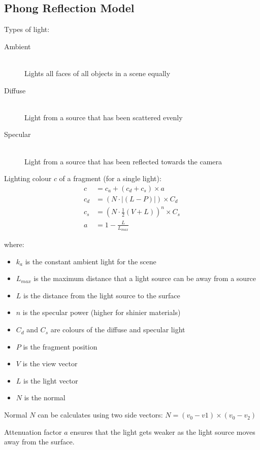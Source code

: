 \documentclass[a4paper]{article}
\begin{document}
\subsection{Phong Reflection Model}

Types of light:

\begin{description}
  \item[Ambient] \hfill \\
    Lights all faces of all objects in a scene equally
  \item[Diffuse] \hfill \\
    Light from a source that has been scattered evenly
  \item[Specular] \hfill \\
    Light from a source that has been reflected towards the camera
\end{description}

Lighting colour $c$ of a fragment (for a single light):
\begin{align*}
      c &= c_{a} + (c_{d} + c_{s}) \times a \\
  c_{d} &= (N \cdot |(L - P)|) \times C_{d} \\
  c_{s} &= (N \cdot \frac{1}{2}(V + L))^{n} \times C_{s}\\
      a &= 1 - \frac{L}{L_{max}}
\end{align*}

where:

\begin{itemize}
  \item $k_{a}$ is the constant ambient light for the scene
  \item $L_{max}$ is the maximum distance that a light source can be away from a
        source
  \item $L$ is the distance from the light source to the surface
  \item $n$ is the specular power (higher for shinier materials)
  \item $C_{d}$ and $C_{s}$ are colours of the diffuse and specular light
  \item $P$ is the fragment position
  \item $V$ is the view vector
  \item $L$ is the light vector
  \item $N$ is the normal
\end{itemize}

Normal $N$ can be calculates using two side vectors: $N = (v_{0} - v{1}) \times
(v_{0} - v_{2})$

Attenuation factor $a$ ensures that the light gets weaker as the light source
moves away from the surface.
\end{document}
